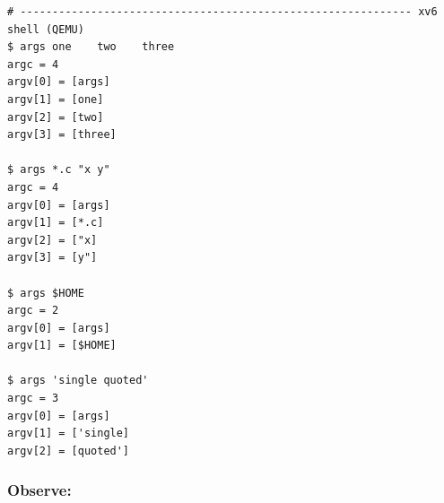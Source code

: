 \documentclass{labreport}
\begin{document}
\begin{lstlisting}[style=bash]
# ------------------------------------------------------------- xv6 shell (QEMU)
$ args one    two    three
argc = 4
argv[0] = [args]
argv[1] = [one]
argv[2] = [two]
argv[3] = [three]

$ args *.c "x y"
argc = 4
argv[0] = [args]
argv[1] = [*.c]
argv[2] = ["x]
argv[3] = [y"]

$ args $HOME
argc = 2
argv[0] = [args]
argv[1] = [$HOME]

$ args 'single quoted'
argc = 3
argv[0] = [args]
argv[1] = ['single]
argv[2] = [quoted']
\end{lstlisting}

\subsubsection*{Observe:}
\end{document}
